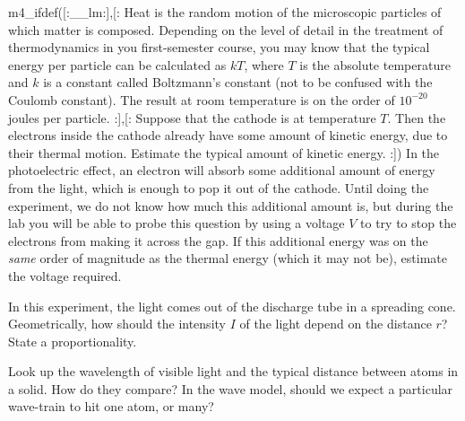 \prelabquestion m4_ifdef([:__lm:],[:
Heat is the random motion of the microscopic particles of which matter is composed. Depending on the
level of detail in the treatment of thermodynamics in you first-semester course, you may know that the
typical energy per particle can be calculated as $kT$, where $T$ is the absolute temperature and $k$ is
a constant called Boltzmann's constant (not to be confused with the Coulomb constant). The result at
room temperature is on the order of $10^{-20}$ joules per particle.
:],[:
Suppose that the cathode is at temperature $T$. Then the electrons inside the cathode
already have some amount of kinetic energy, due to their thermal motion. Estimate the typical amount
of kinetic energy.
:])%
In the photoelectric effect, an electron will absorb some additional amount of
energy from the light, which is enough to pop it out of the cathode. Until doing the experiment,
we do not know how much this additional amount is, but during the lab you will be able to probe this
question by using a voltage $V$ to try to stop the electrons from making it across the gap. If
this additional energy was on the \emph{same} order of magnitude as the thermal energy (which it may not
be), estimate the voltage required.

\prelabquestion In this experiment, the light comes out of the discharge tube in a spreading cone.
Geometrically, how should the intensity $I$ of the light depend on the distance $r$? State a proportionality.

\prelabquestion Look up the wavelength of visible light and the typical distance between atoms in a solid.
How do they compare? In the wave model, should we expect a particular wave-train to hit one atom, or many?
